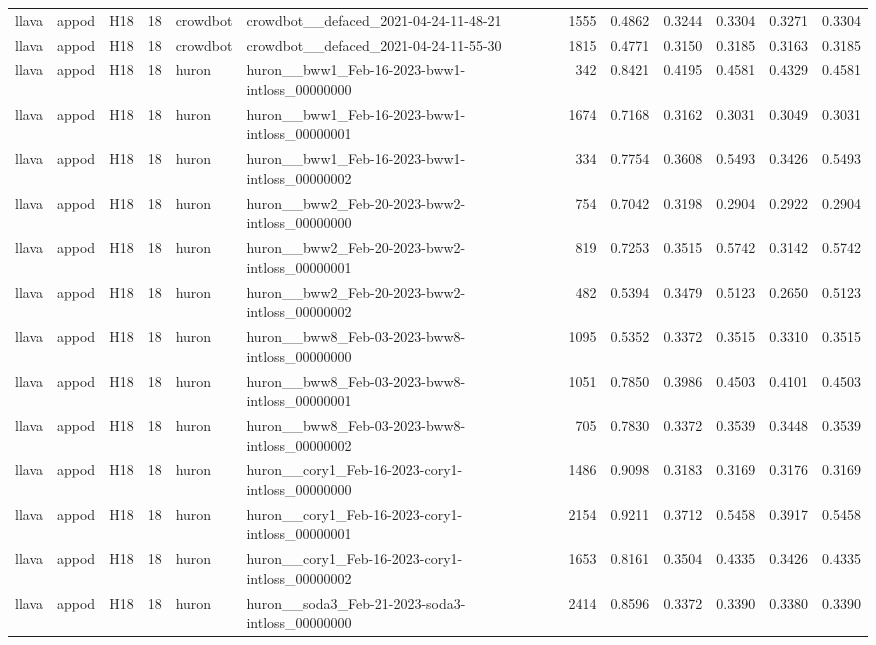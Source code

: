 \begin{table}[tbp]
\begin{tabular}{lllrllrrrrrr}
llava & appod & H18 & 18 & crowdbot & crowdbot\_\_defaced\_2021-04-24-11-48-21 & 1555 & 0.4862 & 0.3244 & 0.3304 & 0.3271 & 0.3304 \\
llava & appod & H18 & 18 & crowdbot & crowdbot\_\_defaced\_2021-04-24-11-55-30 & 1815 & 0.4771 & 0.3150 & 0.3185 & 0.3163 & 0.3185 \\
llava & appod & H18 & 18 & huron & huron\_\_bww1\_Feb-16-2023-bww1-intloss\_00000000 & 342 & 0.8421 & 0.4195 & 0.4581 & 0.4329 & 0.4581 \\
llava & appod & H18 & 18 & huron & huron\_\_bww1\_Feb-16-2023-bww1-intloss\_00000001 & 1674 & 0.7168 & 0.3162 & 0.3031 & 0.3049 & 0.3031 \\
llava & appod & H18 & 18 & huron & huron\_\_bww1\_Feb-16-2023-bww1-intloss\_00000002 & 334 & 0.7754 & 0.3608 & 0.5493 & 0.3426 & 0.5493 \\
llava & appod & H18 & 18 & huron & huron\_\_bww2\_Feb-20-2023-bww2-intloss\_00000000 & 754 & 0.7042 & 0.3198 & 0.2904 & 0.2922 & 0.2904 \\
llava & appod & H18 & 18 & huron & huron\_\_bww2\_Feb-20-2023-bww2-intloss\_00000001 & 819 & 0.7253 & 0.3515 & 0.5742 & 0.3142 & 0.5742 \\
llava & appod & H18 & 18 & huron & huron\_\_bww2\_Feb-20-2023-bww2-intloss\_00000002 & 482 & 0.5394 & 0.3479 & 0.5123 & 0.2650 & 0.5123 \\
llava & appod & H18 & 18 & huron & huron\_\_bww8\_Feb-03-2023-bww8-intloss\_00000000 & 1095 & 0.5352 & 0.3372 & 0.3515 & 0.3310 & 0.3515 \\
llava & appod & H18 & 18 & huron & huron\_\_bww8\_Feb-03-2023-bww8-intloss\_00000001 & 1051 & 0.7850 & 0.3986 & 0.4503 & 0.4101 & 0.4503 \\
llava & appod & H18 & 18 & huron & huron\_\_bww8\_Feb-03-2023-bww8-intloss\_00000002 & 705 & 0.7830 & 0.3372 & 0.3539 & 0.3448 & 0.3539 \\
llava & appod & H18 & 18 & huron & huron\_\_cory1\_Feb-16-2023-cory1-intloss\_00000000 & 1486 & 0.9098 & 0.3183 & 0.3169 & 0.3176 & 0.3169 \\
llava & appod & H18 & 18 & huron & huron\_\_cory1\_Feb-16-2023-cory1-intloss\_00000001 & 2154 & 0.9211 & 0.3712 & 0.5458 & 0.3917 & 0.5458 \\
llava & appod & H18 & 18 & huron & huron\_\_cory1\_Feb-16-2023-cory1-intloss\_00000002 & 1653 & 0.8161 & 0.3504 & 0.4335 & 0.3426 & 0.4335 \\
llava & appod & H18 & 18 & huron & huron\_\_soda3\_Feb-21-2023-soda3-intloss\_00000000 & 2414 & 0.8596 & 0.3372 & 0.3390 & 0.3380 & 0.3390 \\

\end{tabular}
\end{table}

